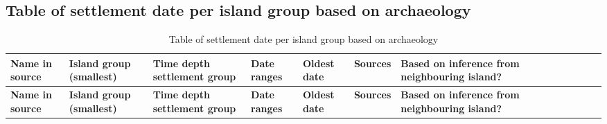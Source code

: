 \documentclass[a4paper,10pt]{article} %
\begin{document}
\subsection{Table of settlement date per island group based on archaeology}
\singlespacing
\label{dates_table_appendic}
\begin{landscape}
\begin{longtable}{| p{3cm}| p{4cm}| p{4cm}|p{2cm}|p{2cm}|p{2cm}|p{2cm}|p{2cm}|p{2cm}|p{2cm}|p{2cm}|p{2cm}|p{2cm}|p{2cm}}

\caption{{Table of settlement date per island group based on archaeology}} \label{dates_pol_complex_table}\\
\hline
\textbf{ Name in source } & \textbf{Island group (smallest) } & \textbf{ Time depth settlement group } & \textbf{ Date ranges } & \textbf{ Oldest date } & \textbf{ Sources} & \textbf{ Based on inference from neighbouring island? } \\ \hline
\endfirsthead

\hline
\textbf{ Name in source } & \textbf{ ﻿Island group (smallest) } & \textbf{ Time depth settlement group } & \textbf{ Date ranges } & \textbf{ Oldest date } & \textbf{ Sources} & \textbf{ Based on inference from neighbouring island? } \\ \hline
\endhead


\end{longtable}
\end{landscape}
\end{document}
